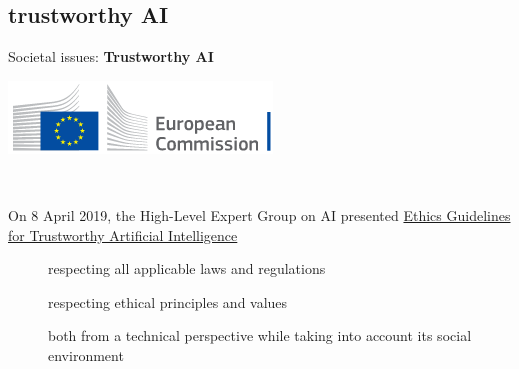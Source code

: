 \documentclass[10pt,serif,mathserif,compress,hyperref={colorlinks}]{beamer}
\begin{document}
\subsection{trustworthy AI}

\begin{frame}{Societal issues: {\bf Trustworthy AI}}

  \hspace*{-2mm}\begin{minipage}{.35\textwidth}
    \includegraphics[width=\linewidth]{images/logo-ec--en.png}
  \end{minipage}\ \begin{minipage}{.65\textwidth}
  \small
    On 8 April 2019, the High-Level Expert Group on AI presented
  \href{https://digital-strategy.ec.europa.eu/en/library/ethics-guidelines-trustworthy-ai}
       {Ethics Guidelines for Trustworthy Artificial Intelligence}
  \end{minipage}
\bigskip      
  \begin{tcolorbox}[title={According to the Guidelines, trustworthy AI should be:}]   
    
    \begin{description}
    \item[]  respecting all applicable laws and regulations
    \item[] respecting ethical principles and values
    \item[] both from a technical perspective while taking into account its social environment       
    \end{description}
  \end{tcolorbox}   
       
\end{frame}
\end{document}
